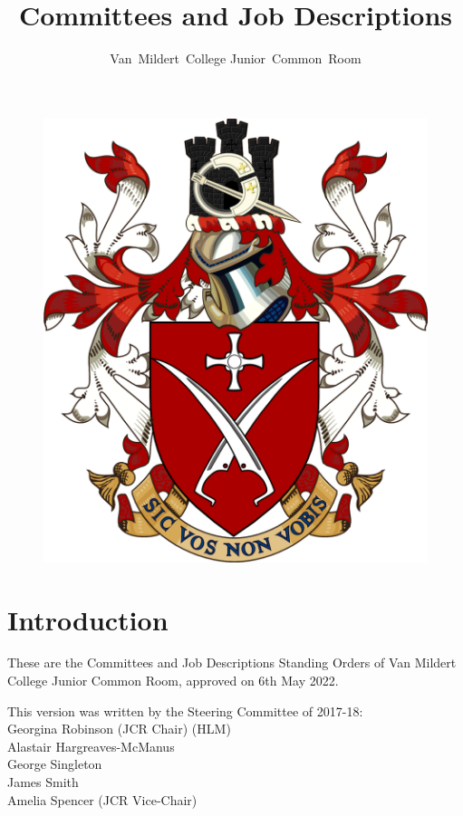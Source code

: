\documentclass[12pt]{article}
\title{Committees and Job Descriptions}
\author{Van~Mildert~College Junior~Common~Room}
\date{\thedate}
\newcommand{\thedate}{6th May 2022}
\begin{document}
\begin{titlepage}  %
    \maketitle
    \begin{figure}[h]
    \includegraphics[scale=0.25]{arms}  %
    \centering
    \end{figure}
    \thispagestyle{empty}
\end{titlepage}

\setcounter{page}{2}  %
\section*{Introduction}
These are the Committees and Job Descriptions Standing Orders of Van Mildert College Junior Common Room, approved on \thedate.

This version was written by the Steering Committee of 2017-18:\\
\hspace*{2cm}Georgina Robinson (JCR Chair) (HLM)\\
\hspace*{2cm}Alastair Hargreaves-McManus\\
\hspace*{2cm}George Singleton\\
\hspace*{2cm}James Smith\\
\hspace*{2cm}Amelia Spencer (JCR Vice-Chair)
\end{document}

